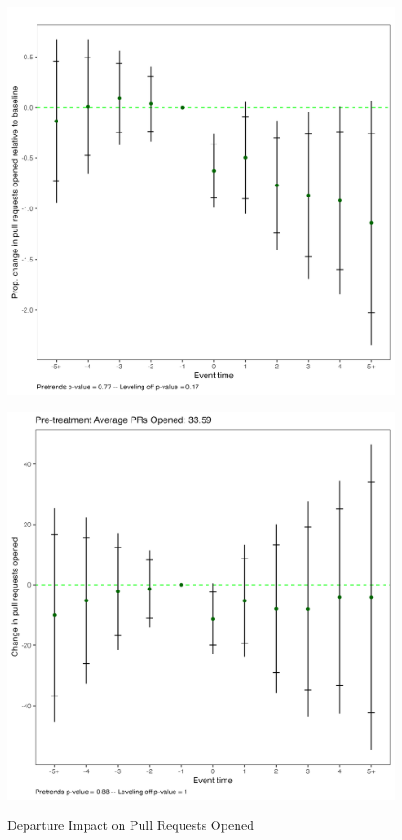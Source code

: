 \begin{figure}[htbp]
    \centering
    \begin{minipage}[b]{0.45\textwidth}
        \centering
    \includegraphics[width=\textwidth]{temp/prs_opened_norm_full_sample.png}
        \label{fig:prs_opened_norm_full_sample}
    \end{minipage}
    \hfill
    \begin{minipage}[b]{0.45\textwidth}
        \centering
        \includegraphics[width=\textwidth]{temp/prs_opened_full_sample.png}
        \label{fig:prs_opened_full_sample}
    \end{minipage}
    \caption{Departure Impact on Pull Requests Opened}
    \label{fig:prs_opened_full_sample}
\end{figure}
